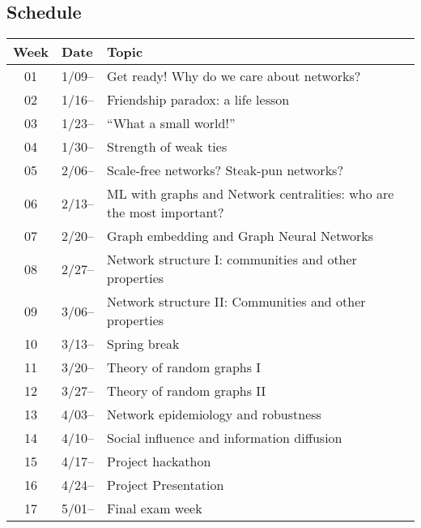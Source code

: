 \subsection{Schedule}\label{sub:schedule}%

\begin{tabular}{@{}cll@{}} \toprule
  Week & Date & Topic \\\midrule
  01 & 1/09-- & Get ready! Why do we care about networks? \\
  02 & 1/16-- & Friendship paradox: a life lesson \\
  03 & 1/23-- & ``What a small world!'' \\
  04 & 1/30-- & Strength of weak ties \\
  05 & 2/06-- & Scale-free networks? Steak-pun networks? \\
  06 & 2/13-- & ML with graphs and Network centralities: who are the most important? \\
  07 & 2/20-- & Graph embedding and Graph Neural Networks \\
  08 & 2/27-- & Network structure I: communities and other properties  \\
  09 & 3/06-- & Network structure II: Communities and other properties  \\
  10 & 3/13-- & Spring break \\
  11 & 3/20-- & Theory of random graphs I \\
  12 & 3/27-- & Theory of random graphs II \\
  13 & 4/03-- & Network epidemiology and robustness \\
  14 & 4/10-- & Social influence and information diffusion \\
  15 & 4/17-- & Project hackathon \\
  16 & 4/24-- & Project Presentation \\
  17 & 5/01-- & Final exam week \\
  \bottomrule
\end{tabular}


